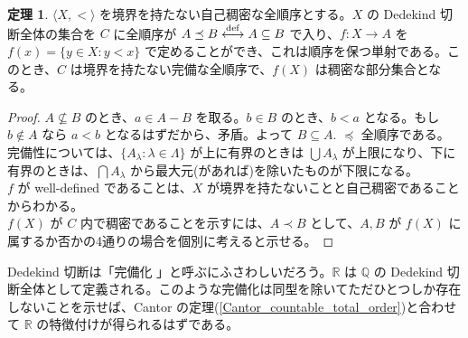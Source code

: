 \documentclass{jsarticle}
\theoremstyle{definition}
\newtheorem{theorem}{定理}[section]
\begin{document}
    \begin{theorem}
        $\langle X, < \rangle$ を境界を持たない自己稠密な全順序とする。$X$ の Dedekind 切断全体の集合を $C$ に全順序が $A \preceq B \overset{{\rm def}}{\longleftrightarrow} A \subseteq B$ で入り、$f : X \rightarrow A$ を $f(x) = \{y \in X : y < x\}$ で定めることができ、これは順序を保つ単射である。このとき、$C$ は境界を持たない完備な全順序で、$f(X)$ は稠密な部分集合となる。
    \end{theorem}
    \begin{proof}
        $A \not\subseteq B$ のとき、$a \in A - B$ を取る。$b \in B$ のとき、$b < a$ となる。もし $b \not\in A$ なら $a < b$ となるはずだから、矛盾。よって $B \subseteq A.$ $\preceq$ 全順序である。\\
        完備性については、$\{A_\lambda : \lambda \in \Lambda\}$ が上に有界のときは $\bigcup A_\lambda$ が上限になり、下に有界のときは、$\bigcap A_\lambda$ から最大元(があれば)を除いたものが下限になる。\\
        $f$ が well-defined であることは、$X$ が境界を持たないことと自己稠密であることからわかる。\\
        $f(X)$ が $C$ 内で稠密であることを示すには、$A \prec B$ として、$A, B$ が $f(X)$ に属するか否かの4通りの場合を個別に考えると示せる。
    \end{proof}
    
    \vspace{0.5ex}
    Dedekind 切断は「完備化 」と呼ぶにふさわしいだろう。$\mathbb{R}$ は $\mathbb{Q}$ の Dedekind 切断全体として定義される。このような完備化は同型を除いてただひとつしか存在しないことを示せば、Cantor の定理(\ref{Cantor_countable_total_order})と合わせて $\mathbb{R}$ の特徴付けが得られるはずである。
    \vspace{0.5ex}
    
\end{document}
